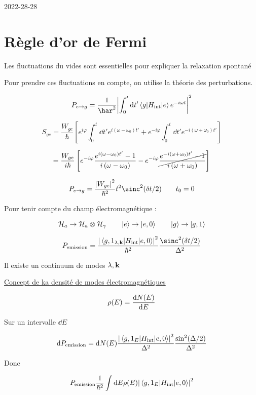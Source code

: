 


2022-28-28

\section*{Règle d'or de Fermi}

Les fluctuations du vides sont essentielles pour expliquer la relaxation spontané

Pour prendre ces fluctuations en compte, on utilise la théorie des perturbations.


$$P_{e\to{}g} = \frac{1}{\har^2} \abs{\int_{0}^{t}\dd t' \mel{g}{H_{\text{int}}}{e} e^{-i\omega t} }^{2}$$ 



$$S_{ge} = \frac{W_{ge}}{\hbar} \left[ e^{i\varphi} \int_{0}^{t}\dd t' e^{i\left( \omega - \omega_0 \right)t' } + e^{-i\varphi} \int_0^{t}\dd t' e^{-i\left( \omega+ \omega_0 \right)t' } \right] $$ 

$$= \frac{W_{ge}}{i\hbar} \left[ e^{-i\varphi} \frac{e^{i\left( \omega - \omega_0 \right)t' }-1}{i \left( \omega-\omega_0	 \right) } - e^{-i\varphi} \cancel{\frac{e^{-i\left( \omega + \omega_0 \right)t' }-1}{i \left( \omega+\omega_0	 \right) }}  \right] $$ 

$$P_{e\to{}g} = \frac{\abs{W_{ge} }^{2}}{\hbar^2} t^{2}\sinc^{2}(\delta t/2) \qquad t_0 =0 $$ 

Pour tenir compte du champ électromagnétique :

$$\mathcal{H}_a \to \mathcal{H} _a \otimes \mathcal{H}_\gamma \qquad \ket{e} \to \ket{e,0} \qquad \ket{g} \to \ket{g,1}$$

$$P_{\text{emission}} = \frac{\abs{\mel{g, 1_{\lambda,\vb{k} }}{H_{\text{int}}{} }{e,0}}^{2}}{\hbar^2} \frac{\sinc^{2}(\delta t/2)}{\Delta^2}  $$ 

Il existe un continuum de modes $\lambda, \vb{k}$ 

\underline{Concept de ka densité de modes électromagnétiques} 

$$\rho (E) = \dv{N(E)}{E} $$ 

Sur un intervalle $\dd E$ 

$$\dd P_{\text{emission}} = \dd N(E) \frac{\abs{\mel{g,1_E}{H_{\text{int}} }{e,0}}^{2}}{\Delta^2} \frac{\sin^2(\Delta /2)}{\Delta ^2} $$ 

Donc

$$P_{\text{emission}} \frac{1}{\hbar^2} \int \dd E \rho (E) \abs{\mel{g,1_E}{H_{\text{int}} }{e,0}}^{2}$$ 

